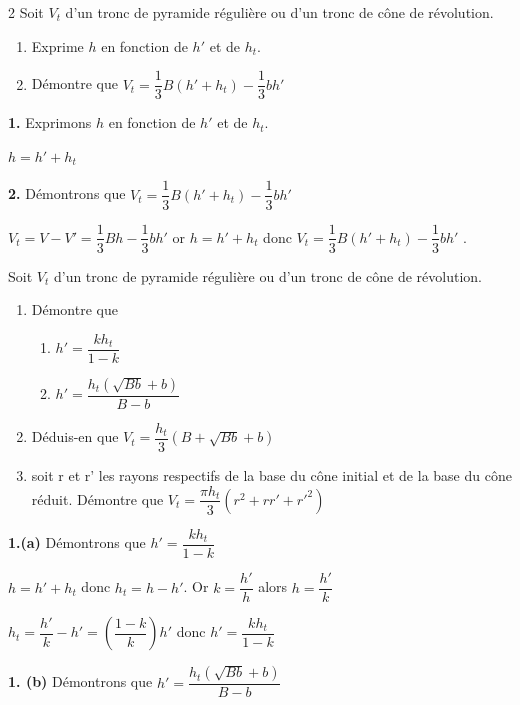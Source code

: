 \begin{multicols*}{2}
  	Soit $V_{t}$ d’un tronc de pyramide régulière ou d'un tronc de cône de révolution.
  	\begin{enumerate}
  		\item Exprime $h$ en fonction de $h'$  et de $h_{t}$.
  		\item  Démontre que $V_{t}=\dfrac{1}{3}B\left(h'+h_{t}\right)-\dfrac{1}{3}bh'$
  	\end{enumerate}
  	\dure
  	\resul
  	\textbf{1.} Exprimons $h$ en fonction de $h'$  et de $h_{t}$.
  	
  	$h=h'+h_{t}$
  	
  	\textbf{2.} Démontrons que $V_{t}=\dfrac{1}{3}B\left(h'+h_{t}\right)-\dfrac{1}{3}bh'$ 
  	
  	$V_{t}=V-V'=\dfrac{1}{3}Bh-\dfrac{1}{3}bh'$ or $h=h'+h_{t}$ donc $V_{t}=\dfrac{1}{3}B\left(h'+h_{t}\right)-\dfrac{1}{3}bh'$ .
  	
  	Soit $V_{t}$ d’un tronc de pyramide régulière ou d'un tronc de cône de révolution.
  	\begin{enumerate}
  		\item Démontre que
  		\begin{enumerate}
  			\item  $h'=\dfrac{kh_{t}}{1-k}$
  			\item  $h'=\dfrac{h_{t}\left(\sqrt{Bb}+b\right)}{B-b}$
  		\end{enumerate}
  		\item Déduis-en que $V_{t}=\dfrac{h_{t}}{3}\left(B+\sqrt{Bb}+b\right)$
  		\item soit r et r' les rayons respectifs de la base du cône initial et de la base du cône réduit. Démontre que $V_{t}=\dfrac{\pi h_{t}}{3}\left(r^2+rr'+r'^2\right)$
  	\end{enumerate}
  	\dure
  	\resul
  	\textbf{1.(a)} Démontrons que $h'=\dfrac{kh_{t}}{1-k}$
  	
  	$h=h'+h_{t}$  donc $h_{t}=h-h'$. Or  $k=\dfrac{h'}{h}$ alors $h=\dfrac{h'}{k}$
  	
  	$h_{t}=\dfrac{h'}{k}-h'= \left(\dfrac{1-k}{k}\right)h'$ donc $h'=\dfrac{kh_{t}}{1-k}$
  	
  	\textbf{1. (b)} Démontrons que $h'=\dfrac{h_{t}\left(\sqrt{Bb}+b\right)}{B-b}$\vspace{0.2cm}
  	

\end{multicols*}
